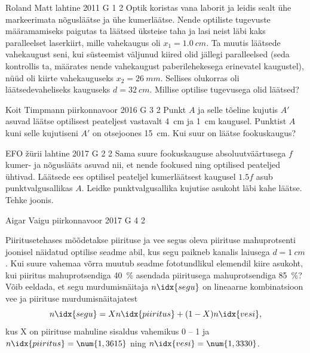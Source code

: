 \documentclass[11pt]{article}
\begin{document}
{%
{Roland Matt} %
{lahtine} %
{2011} %
{G 1} %
{2} %
{
\ifStatement
Optik koristas vana laborit ja leidis sealt ühe markeerimata nõgusläätse ja ühe
kumerläätse. Nende optiliste tugevuste määramamiseks paigutas ta läätsed
üksteise taha ja lasi neist läbi kaks paralleelset laserkiirt, mille vahekaugus
oli $x_{1}=\SI{1,0}{cm}$. Ta muutis läätsede vahekaugust seni, kui süsteemist väljunud
kiired olid jällegi paralleelsed (seda kontrollis ta, määrates nende vahekaugust
paberilehekesega erinevatel kaugustel), nüüd oli kiirte vahekauguseks
$x_{2}=\SI{26}{mm}$. Sellises olukorras oli läätsedevaheliseks kauguseks 
$d=\SI{32}{cm}$.
Millise optilise tugevusega olid läätsed?
\fi
}

{Koit Timpmann} %
{piirkonnavoor} %
{2016} %
{G 3} %
{2} %
{
\ifStatement
Punkt $A$ ja selle tõeline kujutis $A'$ asuvad läätse optilisest peateljest vastavalt \SI{4}{cm} ja \SI{1}{cm} kaugusel. Punktist $A$ kuni selle kujutiseni $A'$ on otsejoones \SI{15}{cm}. Kui suur on läätse fookuskaugus?
\fi
}

{EFO žürii} %
{lahtine} %
{2017} %
{G 2} %
{2} %
{
\ifStatement
Sama suure fookuskauguse absoluutväärtusega $f$ kumer- ja nõguslääts asuvad nii, et nende fookused ning optilised peateljed ühtivad. Läätsede ees optilisel peateljel kumerläätsest kaugusel $\num{1,5}f$ asub punktvalgusallikas $A$. Leidke punktvalgusallika kujutise asukoht läbi kahe läätse. Tehke joonis.
\fi
}

{Aigar Vaigu} %
{piirkonnavoor} %
{2017} %
{G 4} %
{2} %
{
\ifStatement
Piiritusetehases mõõdetakse piirituse ja vee segus oleva piirituse mahuprotsenti joonisel näidatud optilise seadme abil, kus segu paikneb kanalis laiusega $d=\SI{1}{cm}$. 
Kui suure vahemaa võrra muutub seadme fototundlikul elemendil kiire asukoht, kui piiritus mahuprotsendiga \SI{40}{\percent} asendada piiritusega mahuprotsendiga \SI{85}{\percent}?
Võib eeldada, et segu murdumisnäitaja $n\idx{segu}$ on lineaarne kombinatsioon vee ja piirituse murdumisnäitajatest
$$
n\idx{segu}=Xn\idx{piiritus}+(1-X)n\idx{vesi},
$$
kus X on piirituse mahuline sisaldus vahemikus 0 -- 1 ja $n\idx{piiritus}=\num{1,3615}$ ning $n\idx{vesi}=\num{1,3330}$.

}}
\end{document}
